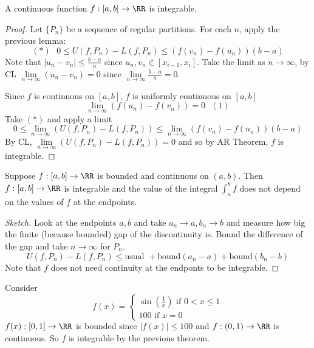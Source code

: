 \documentclass[12pt]{scrartcl}
\begin{document}
\begin{theorem}
  A continuous function $f: [a,b] \to \RR$ is integrable.

  \begin{proof}
    
    \hfill

  Let $\{P_n\}$ be a sequence of regular partitions. For each $n$, apply the previous lemma: \[(*) \ \ \ 0 \leq U(f, P_n) - L(f, P_n) \leq (f(v_n) - f(u_n))(b-a)\]
  Note that $|u_n - v_n| \leq \frac{b-a}{n}$ since $u_n, v_n \in [x_{i-1}, x_i]$.
  Take the limit as $n\to\infty$, by CL $\underset{n\to\infty}{\lim}(u_n - v_n) = 0$ since 
  $\underset{n\to\infty}{\lim}\frac{b-a}{n} = 0$.

  Since $f$ is continuous on $[a,b]$, $f$ is uniformly continuous on $[a,b]$ 
  \[\underset{n\to\infty}{\lim}(f(u_n) - f(v_n)) = 0 \ \ \ (1)\]
  Take $(*)$ and apply a limit 
  \[0 \leq \lim_{n\to\infty}(U(f, P_n) - L(f, P_n)) \leq \lim_{n\to\infty}(f(v_n) - f(u_n))(b-a)\]
  By CL, $\underset{n\to\infty}{\lim}(U(f, P_n) - L(f, P_n)) = 0$ and so by AR Theorem, 
  $f$ is integrable.
  \end{proof}
\end{theorem}

\begin{theorem}
  Suppose $f: [a,b] \to \RR$ is bounded and continuous on $(a,b)$. Then 
  $f: [a,b]\to\RR$ is integrable and the value of the integral $\int_a^b f$ does not 
  depend on the values of $f$ at the endpoints.

  \begin{proof}[Sketch]
    Look at the endpoints $a, b$ and take $a_n \to a, b_n \to b$ and measure how 
    big the finite (because bounded) gap of the discontinuity is. Bound the difference of the gap and take 
    $n\to\infty$ for $P_n$.
    \[U(f, P_n) - L(f, P_n) \leq \text{usual } + \text{bound}(a_n-a) + \text{bound}(b_n - b)\]
    Note that $f$ does not need continuity at the endponts to be integrable.
  \end{proof}
\end{theorem}

\begin{example}
  Consider
  \[f(x) = \begin{cases}
    \sin(\frac{1}{x}) \text{ if } 0 < x \leq 1\\
    100 \text{  if } x = 0
  \end{cases}\]
  $f(x): [0,1] \to \RR$ is bounded since $|f(x)| \leq 100$ and $f: (0,1) \to\RR$ is continuous. So $f$ is 
  integrable by the previous theorem.
\end{example}
\end{document}

